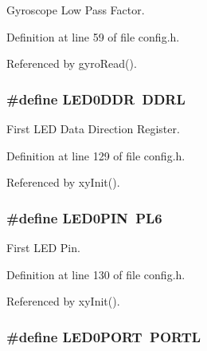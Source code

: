 Gyroscope Low Pass Factor. 



Definition at line 59 of file config.\-h.



Referenced by gyro\-Read().

\hypertarget{group__config_ga86208659221ec2a932cd722dfc18101f}{
\subsubsection[{L\-E\-D0\-D\-D\-R}]{\setlength{\rightskip}{0pt plus 5cm}\#define L\-E\-D0\-D\-D\-R~D\-D\-R\-L}}\label{group__config_ga86208659221ec2a932cd722dfc18101f}


First L\-E\-D Data Direction Register. 



Definition at line 129 of file config.\-h.



Referenced by xy\-Init().

\hypertarget{group__config_gab0e1f692e2b1fa1cdbb24a9926b3489d}{
\subsubsection[{L\-E\-D0\-P\-I\-N}]{\setlength{\rightskip}{0pt plus 5cm}\#define L\-E\-D0\-P\-I\-N~P\-L6}}\label{group__config_gab0e1f692e2b1fa1cdbb24a9926b3489d}


First L\-E\-D Pin. 



Definition at line 130 of file config.\-h.



Referenced by xy\-Init().

\hypertarget{group__config_gac0f99671c3447a31e5d3755e1f11ee1f}{
\subsubsection[{L\-E\-D0\-P\-O\-R\-T}]{\setlength{\rightskip}{0pt plus 5cm}\#define L\-E\-D0\-P\-O\-R\-T~P\-O\-R\-T\-L}}\label{group__config_gac0f99671c3447a31e5d3755e1f11ee1f}


